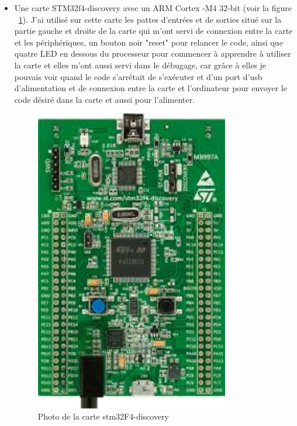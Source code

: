 \documentclass[a4paper]{article}
\begin{document}
 \begin{itemize}
 
\item Une carte STM32f4-discovery avec un ARM Cortex -M4 32-bit (voir la figure ~\ref{fig:Carte}). J'ai utilisé sur cette carte les pattes d'entrées et de sorties situé sur la partie gauche et droite de la carte qui m'ont servi de connexion entre la carte et les périphériques, un bouton noir "reset" pour relancer le code, ainsi que quatre LED en dessous du processeur pour commencer à apprendre à utiliser la carte et elles m'ont aussi servi dans le débugage, car grâce à elles je pouvais voir quand le code s'arrêtait de s'exécuter et d'un port d'usb d'alimentation et de connexion entre la carte et l'ordinateur pour envoyer le code désiré dans la carte et aussi pour l'alimenter. 
 
 \begin{figure}[!ht]
\centering
\includegraphics[width=0.8\textwidth]{index.jpeg}
\caption{\label{fig:Carte}Photo de la carte stm32F4-discovery}
\end{figure}
  

\end{itemize}
\end{document}
